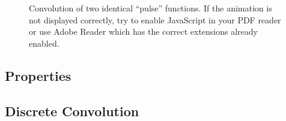 \begin{figure}[H]
    \centering
    \caption{Convolution of two identical ``pulse'' functions. If the animation is not displayed correctly, try to enable JavaScript in your PDF reader or use Adobe Reader which has the correct extensions already enabled.}
\end{figure}

\subsection{Properties} 

\subsection{Discrete Convolution} 

